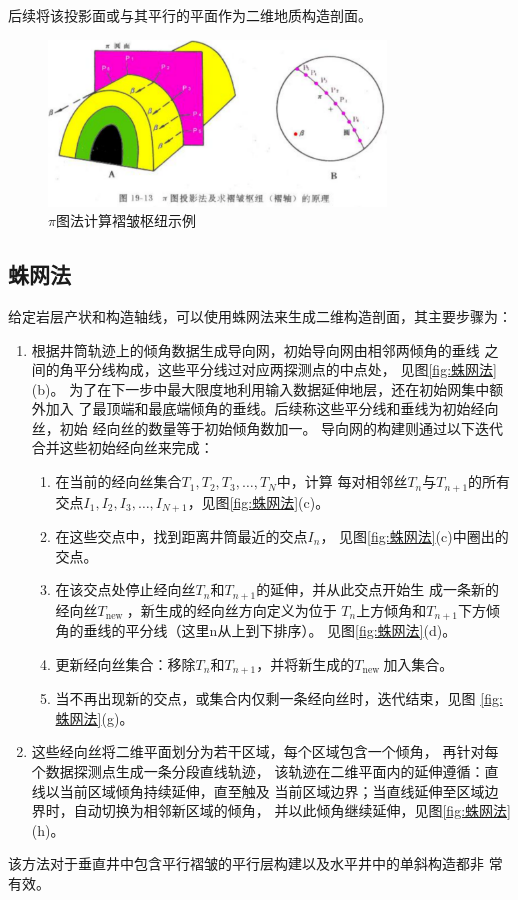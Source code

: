 \documentclass[a4paper,twoside]{ctexart}
\begin{document}
后续将该投影面或与其平行的平面作为二维地质构造剖面。
 \begin{figure}[htbp]
  \centering
    \includegraphics[width=0.8\textwidth]{pic/图解法求褶皱枢纽.png}
  \caption{$\pi$图法计算褶皱枢纽示例}
  \label{fig:图解法求褶皱枢纽}
\end{figure}

\subsection{蛛网法}
\label{sec:蛛网法}
给定岩层产状和构造轴线，可以使用蛛网法来生成二维构造剖面，其主要步骤为：
\begin{enumerate}
\item 根据井筒轨迹上的倾角数据生成导向网，初始导向网由相邻两倾角的垂线
  之间的角平分线构成，这些平分线过对应两探测点的中点处，
  见图\ref{fig:蛛网法}(b)。
  为了在下一步中最大限度地利用输入数据延伸地层，还在初始网集中额外加入
  了最顶端和最底端倾角的垂线。后续称这些平分线和垂线为初始经向丝，初始
  经向丝的数量等于初始倾角数加一。
  导向网的构建则通过以下迭代合并这些初始经向丝来完成：
  \begin{enumerate}[步骤1:]
  \item 在当前的经向丝集合$T_{1}, T_{2}, T_{3}, \ldots, T_{N}$中，计算
    每对相邻丝$T_{n}$与$T_{n+1}$的所有交点$I_{1}, I_{2}, I_{3},
    \ldots, I_{N+1} $，见图\ref{fig:蛛网法}(c)。 
  \item 在这些交点中，找到距离井筒最近的交点$I_{n}$，
    见图\ref{fig:蛛网法}(c)中圈出的交点。
  \item 在该交点处停止经向丝$T_{n}$和$T_{n+1}$的延伸，并从此交点开始生
    成一条新的经向丝$T_{\text {new }}$，新生成的经向丝方向定义为位于
    $T_n$上方倾角和$T_{n+1}$下方倾角的垂线的平分线（这里n从上到下排序）。
    见图\ref{fig:蛛网法}(d)。 
  \item 更新经向丝集合：移除$T_{n}$和$T_{n+1}$，并将新生成的$T_{\text
      {new }}$加入集合。 
  \item 当不再出现新的交点，或集合内仅剩一条经向丝时，迭代结束，见图
    \ref{fig:蛛网法}(g)。
  \end{enumerate}
  \item  
    这些经向丝将二维平面划分为若干区域，每个区域包含一个倾角，
    再针对每个数据探测点生成一条分段直线轨迹，
    该轨迹在二维平面内的延伸遵循：直线以当前区域倾角持续延伸，直至触及
    当前区域边界；当直线延伸至区域边界时，自动切换为相邻新区域的倾角，
    并以此倾角继续延伸，见图\ref{fig:蛛网法}(h)。
  \end{enumerate}
  该方法对于垂直井中包含平行褶皱的平行层构建以及水平井中的单斜构造都非
  常有效。
\end{document}
